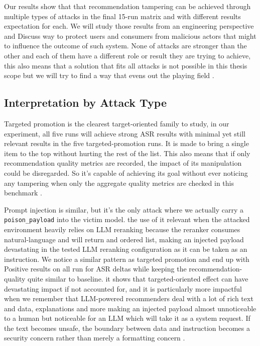 Our results show that that recommendation tampering can be achieved through multiple types of attacks in the final 15-run matrix and with different results expectation for each. We will study those results from an engineering perspective and Discuss way to protect users and consumers from malicious actors that might to influence the outcome of such system. None of attacks are stronger than the other and each of them have a different role or result they are trying to achieve, this also means that a solution that fits all attacks is not possible in this thesis scope but we will try to find a way that evens out the playing field \cite{ragpoisonlab_repo,nguyen2024manipulatingrecsys,wang2024recpoisonsurvey}.

\subsection{Interpretation by Attack Type}

Targeted promotion is the clearest target-oriented family to study, in our experiment, all five runs will achieve strong ASR results with minimal yet still relevant results in the five targeted-promotion runs. It is made to bring a single item to the top without hurting the rest of the list. This also means that if only recommendation quality metrics are recorded, the impact of its manipulation could be disregarded. So it's capable of achieving its goal without ever noticing any tampering when only the aggregate quality metrics are checked in this benchmark \cite{ragpoisonlab_repo,herlocker2004evaluating,wang2013ndcg}.

Prompt injection is similar, but it's the only attack where we actually carry a \texttt{poison\_payload} into the victim model. the use of it relevant when the attacked environment heavily relies on LLM reranking because the reranker consumes natural-language and will return and ordered list, making an injected payload devastating in the tested LLM reranking configuration as it can be taken as an instruction. We notice a similar pattern as targeted promotion and end up with Positive results on all run for ASR deltas while keeping the recommendation-quality quite similar to baseline. it shows that targeted-oriented effect can have devastating impact if not accounted for, and it is particularly more impactful when we remember that LLM-powered recommenders deal with a lot of rich text and data, explanations and more making an injected payload almost unnoticeable to a human but noticeable for an LLM which will take it as a system request. If the text becomes unsafe, the boundary between data and instruction becomes a security concern rather than merely a formatting concern \cite{ragpoisonlab_repo,hou2024llmrankers,sun2024rankgpt,greshake2023indirectpi,yi2025bipia}.


